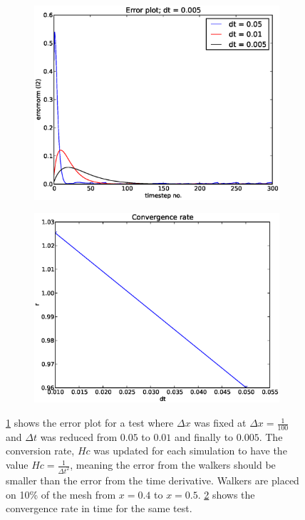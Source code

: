 \begin{figure}[H]
 \centering
 \begin{subfigure}[b]{0.48\textwidth}
 \includegraphics[width=\textwidth]{../doc/results/experiment_15042014_0608_convergence_tests_etc/results/errorplot.eps}
\caption{}  
 \label{combined_BE1d:errorplot}
 \end{subfigure}
 \begin{subfigure}[b]{0.48\textwidth}
  \includegraphics[width=\textwidth]{../doc/results/experiment_15042014_0608_convergence_tests_etc/results/ConvergenceTest.eps}
  \caption{}
   \label{combined_BE1d:convergence}
 \end{subfigure}
 \caption[Error test for BE combined with RW in 1D]{\ref{combined_BE1d:errorplot} shows the error plot for a test where $\Delta x$ was fixed at $\Delta x = \frac{1}{100}$ and $\Delta t$ was reduced from $0.05$ to $0.01$ and finally to $0.005$. 
 The conversion rate, $Hc$ was updated for each simulation to have the value $Hc = \frac{1}{\Delta t^2}$, meaning the error from the walkers should be smaller than the error from the time derivative. 
 Walkers are placed on 10\% of the mesh from $x=0.4$ to $x=0.5$. 
 \ref{combined_BE1d:convergence} shows the convergence rate in time for the same test.}
 \label{combined_BE1d}
\end{figure}

